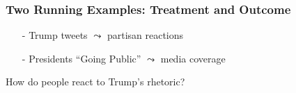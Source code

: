 \documentclass[xcolor=dvipsnames]{beamer}
\begin{document}
\begin{frame}
\frametitle{Two Running Examples: \alert{Treatment} and Outcome}

\huge 
\begin{itemize}
\item[-]  Trump tweets $\leadsto$ partisan reactions
\item[-]  Presidents ``Going Public'' $\leadsto$ media coverage
\end{itemize}	





\end{frame}

\begin{frame}
\huge
How do people react to Trump's rhetoric?

\end{frame}



\begin{frame}



\end{frame}
\end{document}
